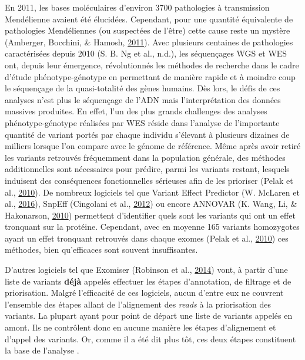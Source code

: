 \documentclass[12pt,twoside]{reedthesis}
\theoremstyle{definition}
\theoremstyle{definition}
\theoremstyle{remark}
\begin{document}
  En 2011, les bases moléculaires d'environ 3700 pathologies à
  transmission Mendélienne avaient été élucidées. Cependant, pour une
  quantité équivalente de pathologies Mendéliennes (ou suspectées de
  l'être) cette cause reste un mystère (Amberger, Bocchini, \& Hamosh,
  \protect\hyperlink{ref-Amberger2011}{2011}). Avec plusieurs centaines de
  pathologies caractérisées depuis 2010 (S. B. Ng et al., n.d.), les
  séquençages WGS et WES ont, depuis leur émergence, révolutionnés les
  méthodes de recherche dans le cadre d'étude phénotype-génotype en
  permettant de manière rapide et à moindre coup le séquençage de la
  quasi-totalité des gènes humains. Dès lors, le défis de ces analyses
  n'est plus le séquençage de l'ADN mais l'interprétation des données
  massives produites. En effet, l'un des plus grands challenges des
  analyses phénotype-génotype réalisées par WES réside dans l'analyse de
  l'importante quantité de variant portés par chaque individu s'élevant à
  plusieurs dizaines de milliers lorsque l'on compare avec le génome de
  référence. Même après avoir retiré les variants retrouvés fréquemment
  dans la population générale, des méthodes additionnelles sont
  nécessaires pour prédire, parmi les variants restant, lesquels induisent
  des conséquences fonctionnelles sérieuses afin de les prioriser (Pelak
  et al., \protect\hyperlink{ref-Pelak2010}{2010}). De nombreux logiciels
  tel que Variant Effect Predictor (W. McLaren et al.,
  \protect\hyperlink{ref-McLaren2016}{2016}), SnpEff (Cingolani et al.,
  \protect\hyperlink{ref-Cingolani2012}{2012}) ou encore ANNOVAR (K. Wang,
  Li, \& Hakonarson, \protect\hyperlink{ref-Wang2010}{2010}) permettent
  d'identifier quels sont les variants qui ont un effet tronquant sur la
  protéine. Cependant, avec en moyenne 165 variants homozygotes ayant un
  effet tronquant retrouvés dans chaque exomes (Pelak et al.,
  \protect\hyperlink{ref-Pelak2010}{2010}) ces méthodes, bien qu'efficaces
  sont souvent insuffisantes.
  
  D'autres logiciels tel que Exomiser (Robinson et al.,
  \protect\hyperlink{ref-Robinson2014}{2014}) vont, à partir d'une liste
  de variants \textbf{déjà} appelés effectuer les étapes d'annotation, de
  filtrage et de priorisation. Malgré l'efficacité de ces logiciels, aucun
  d'entre eux ne couvrent l'ensemble des étapes allant de l'alignement des
  \emph{reads} à la priorisation des variants. La plupart ayant pour point
  de départ une liste de variants appelés en amont. Ils ne contrôlent donc
  en aucune manière les étapes d'alignement et d'appel des variants. Or,
  comme il a été dit plus tôt, ces deux étapes constituent la base de
  l'analyse \protect\hyperlink{section}{}.
  
\end{document}
